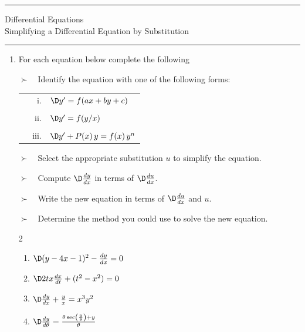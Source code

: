 \documentclass[12pt]{amsart}
\newcommand{\BACKROOT}{../../../..}
\newcommand{\TEACHINGROOT}{\BACKROOT}
\newcommand{\PATHTOHEADERS}{\TEACHINGROOT/Headers}
\numberwithin{equation}{section}
\begin{document}


\pagestyle{empty}

\noindent\rule{7.6in}{0.4pt}

{\centering\sc 
\noindent Differential Equations\\
 Simplifying a Differential Equation by Substitution \\
}
\noindent\rule{7.6in}{0.4pt}

\vspace{0.1cm}

\begin{enumerate}[1.]
\item  For each equation below complete the following

$\succ$ \,\, Identify the equation with one of the following forms:

\setlength{\extrarowheight}{-0.2cm}
\begin{tabular}{p{4.0cm}rl}
	$\,$ & i.   & $\D y' = f(ax+by+c)$ \\
	\\
	$\,$ & ii.  & $\D y' = f(y/x)$ \\
	\\
	$\,$ & iii. & $\D y'+P(x)\,y=f(x)\,y^n$ \\
\end{tabular}

$\succ$ \,\, Select the appropriate substitution $u$ to simplify the equation.

$\succ$ \,\, Compute $\D \frac{dy}{dx}$ in terms of $\D \frac{du}{dx}$.

$\succ$ \,\, Write the new equation in terms of $\D \frac{du}{dx}$ and $u$.

$\succ$ \,\, Determine the method you could use to solve the new equation.

\vspace{0.2cm}

\begin{multicols}{2}
	\begin{enumerate}
	\item[(a)]  $\D (y - 4x - 1)^2 - \frac{dy}{dx} = 0$\\ \vspace{6.2cm}
	\item[(c)]  $\D 2tx \frac{dx}{dt} + (t^2 - x^2) = 0$\\ \vspace{6.2cm}
	\item[(b)]  $\D \frac{dy}{dx} + \frac{y}{x} = x^3 y^2$\\ \vspace{6.2cm}
	\item[(d)]  $\D \frac{dy}{d\theta} = \frac{\theta\sec\left( \frac{y}{\theta} \right) + y}{\theta}$\\ \vspace{6.2cm}
	\end{enumerate}
\end{multicols}


\end{enumerate}
\end{document}
